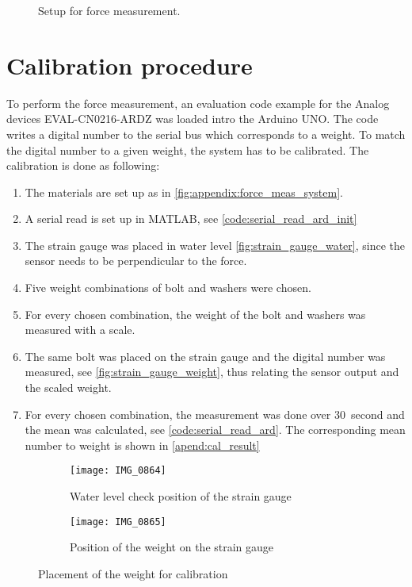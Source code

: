 \begin{figure}[H]
\centering
\def\svgwidth{\columnwidth}

%
\caption{Setup for force measurement.}
		\label{fig:appendix:force_meas_system}
\end{figure}

\section*{Calibration procedure}
To perform the force measurement, an evaluation code example for the Analog devices EVAL-CN0216-ARDZ was loaded intro the Arduino UNO. The code writes a digital number to the serial bus which corresponds to a weight. To match the digital number to a given weight, the system has to be calibrated. The calibration is done as following: 

\begin{enumerate}
\item The materials are set up as in \autoref{fig:appendix:force_meas_system}.
\item A serial read is set up in MATLAB, see \autoref{code:serial_read_ard_init}
\item The strain gauge was placed in water level \autoref{fig:strain_gauge_water}, since the sensor needs to be perpendicular to the force.
\item  Five weight combinations of bolt and washers were chosen.
\item  For every chosen combination, the weight of the bolt and washers was measured with a scale.
\item The same bolt was placed on the strain gauge and the digital number was measured, see \autoref{fig:strain_gauge_weight}, thus relating the sensor output and the scaled weight. 
\item For every chosen combination, the measurement was done over \SI{30}{second} and the mean was calculated, see \autoref{code:serial_read_ard}. The corresponding mean number to weight is shown in \autoref{apend:cal_result}
\end{enumerate}

\begin{figure}[H]
\centering
\begin{subfigure}[htbp]{0.45\textwidth}
		\texttt{[image: IMG\_0864]}
		\caption{Water level check position of the strain gauge}
		\label{fig:strain_gauge_water}
\end{subfigure}\vspace{10pt}
\begin{subfigure}[htbp]{0.45\textwidth}
		\texttt{[image: IMG\_0865]}
		\caption{Position of the weight on the strain gauge}
		\label{fig:strain_gauge_weight}
\end{subfigure} \hspace{10pt}
\caption{Placement of the weight for calibration}
\label{fig:bc_holder}
\end{figure}


